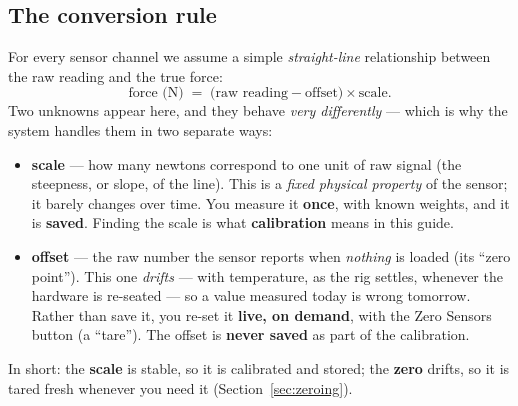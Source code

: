 \documentclass[11pt,a4paper]{article}
\begin{document}
\subsection{The conversion rule}
For every sensor channel we assume a simple \emph{straight-line} relationship
between the raw reading and the true force:
\begin{equation}
  \text{force (N)} \;=\; \bigl(\text{raw reading} - \text{offset}\bigr)\times\text{scale}.
  \label{eq:line}
\end{equation}
Two unknowns appear here, and they behave \emph{very differently} --- which is why
the system handles them in two separate ways:
\begin{itemize}[leftmargin=1.4em]
  \item \textbf{scale} --- how many newtons correspond to one unit of raw signal
        (the steepness, or slope, of the line). This is a \emph{fixed physical
        property} of the sensor; it barely changes over time. You measure it
        \textbf{once}, with known weights, and it is \textbf{saved}. Finding the
        scale is what \textbf{calibration} means in this guide.
  \item \textbf{offset} --- the raw number the sensor reports when \emph{nothing} is
        loaded (its ``zero point''). This one \emph{drifts} --- with temperature, as
        the rig settles, whenever the hardware is re-seated --- so a value measured
        today is wrong tomorrow. Rather than save it, you re-set it \textbf{live, on
        demand}, with the \textsf{Zero Sensors} button (a ``tare''). The offset is
        \textbf{never saved} as part of the calibration.
\end{itemize}
In short: the \textbf{scale} is stable, so it is calibrated and stored; the
\textbf{zero} drifts, so it is tared fresh whenever you need it
(Section~\ref{sec:zeroing}).
\end{document}
